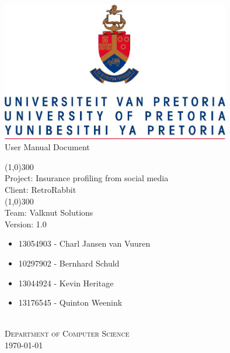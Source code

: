 \documentclass{article}
\begin{document}
	\begin{titlepage}
		\begin{center}
			\includegraphics[width=10cm]{images/UP.jpg}  \\
			[0.5cm]
			\huge{
			User Manual Document\\
			}
			
			\line(1,0){300}\\
			[0.2cm]
			\LARGE{Project: Insurance profiling from social media\\
			Client: RetroRabbit} \\
			\line(1,0){300}\\
			\LARGE{Team: Valknut Solutions}\\
			[1.0cm]
			\large{Version: 1.0}\\
			[1.0cm]
			\large
			{
			\begin{itemize}
				\item 13054903 - Charl Jansen van Vuuren 
				\item 10297902 - Bernhard Schuld      
				\item 13044924 - Kevin Heritage
				\item 13176545 - Quinton Weenink\\
			\end{itemize}
			}
			\textsc{\large}\\
		[3.0cm]
		\textsc{\large  Department of Computer Science}\\
		[0.5cm]
		\textsc{\large \today}\\
		\end{center}
	\end{titlepage}
	
	\cleardoublepage
	\begin{versionhistory}
	\end{versionhistory}	
	
	\cleardoublepage
	\tableofcontents
	\cleardoublepage
	
\end{document}
